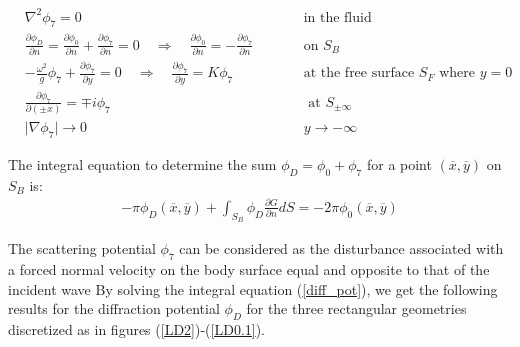 \documentclass[a4paper,10pt]{article}
\newcommand{\dd}{\partial}
\newcommand{\xbar}{\overline{x}}
\newcommand{\ybar}{\overline{y}}
\begin{document}
\begin{align}
&\nabla^2 \phi_7 = 0  \quad  \quad && \text{in the fluid}\\
&\frac{\dd \phi_D}{\dd n} = \frac{\dd \phi_0}{\dd n} + \frac{\dd \phi_7}{\dd n}= 0 \quad \Rightarrow \quad \frac{\dd \phi_0}{\dd n} = - \frac{\dd \phi_7}{\dd n} \quad  \quad && \text{on } S_B\\
&-\frac{\omega^2}{g} \phi_7 + \frac{\dd \phi_7}{\dd y} = 0 \quad \Rightarrow \quad \frac{\dd \phi_7}{\dd y} =  K \phi_7 \quad  \quad &&\text{at the free surface } S_F \text{ where } y=0\\
& \frac{\dd \phi_7}{\dd (\pm x)} = \mp i \phi_7 \quad  \quad && \text{ at } S_{\pm \infty}\\
& \vert \nabla \phi_7 \vert \rightarrow 0 \quad  \quad && y \rightarrow - \infty
\end{align} 

The integral equation to determine the sum $\phi_D = \phi_0 + \phi_7$ for a point $(\xbar, \ybar)$ on $S_B$ is:
\begin{align} \label{diff_pot}
- \pi \phi_D(\xbar, \ybar) + \int_{S_B} \phi_D \frac{\dd G}{\dd n}dS = -2 \pi \phi_0(\xbar, \ybar)
\end{align}

The scattering potential $\phi_7$ can be considered as the disturbance associated with a forced normal velocity on the body surface equal and opposite to that of the incident wave
By solving the integral equation (\ref{diff_pot}), we get the following results for the diffraction potential $\phi_D$ for the three rectangular geometries discretized as in figures (\ref{LD2})-(\ref{LD0.1}).
\end{document}

